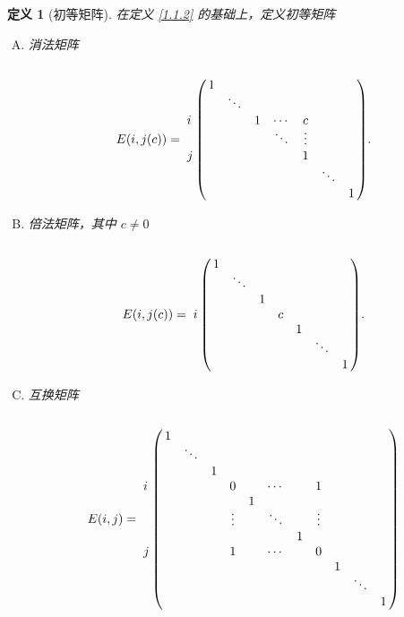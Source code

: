 \documentclass[10pt,openany]{article}
\theoremstyle{thmstyle} %
\theoremstyle{defstyle} %
\newtheorem{definition}[theorem]{定义}
\theoremstyle{prostyle} %
\theoremstyle{exastyle}
\theoremstyle{remstyle}
\begin{document}
\begin{definition}[初等矩阵]
	在定义 \ref{1.1.2} 的基础上，定义初等矩阵
	\begin{enumerate}[(A)]
		\item 消法矩阵
		\[ E(i,j(c))=\bordermatrix{
			& & & & & & & \cr
			& 1 & & & & & &  \cr
			& & \ddots & & & & &  \cr
		\textbf{\(i\)}	& & & 1 & \cdots & c & &  \cr
			& & & & \ddots & \vdots & &  \cr
		\textbf{\(j\)}	& & & & & 1 & &  \cr
			& & & & & & \ddots  &  \cr
			& & & & & & & 1 \cr
		}. \]
		\item 倍法矩阵，其中 \( c \neq 0 \)
		\[ E(i,j(c))=\bordermatrix{
			& & & & & & &  \cr
			& 1 & & & &  & &  \cr
			& & \ddots & & &  & &  \cr
			& & & 1 & &  & &  \cr
			\textbf{\(i\)}	& & & & c & & &   \cr
			& &  & & & 1  & &  \cr
			& & & &  & &\ddots &  \cr
			& & & & & & & 1   \cr
		}. \]
		\item 互换矩阵
		\[
		E(i,j) = \bordermatrix{
			&       &       &       &       &       &       &       &       &       &       &       \cr
			& 1     &       &       &       &       &       &       &       &       &       &       \cr
			&       & \ddots&       &       &       &       &       &       &       &       &       \cr
			&       &       & 1     &       &       &       &       &       &       &       &       \cr
			\textbf{\(i\)} &  &       &       & 0     &       & \cdots&       & 1     &       &       &       \cr
			&       &       &       &       & 1     &       &       &       &       &       &       \cr
			&       &       &       & \vdots&       & \ddots&       & \vdots&       &       &       \cr
			&       &       &       &       &       &       & 1     &       &       &       &       \cr
			\textbf{\(j\)} &  &       &       & 1     &       & \cdots&       & 0     &       &       &       \cr
			&       &       &       &       &       &       &       &       & 1     &       &       \cr
			&       &       &       &       &       &       &       &       &       & \ddots&       \cr
			&       &       &       &       &       &       &       &       &       &       & 1     
		}
		\]
		
	\end{enumerate}
	\label{1.3.3}
\end{definition}
\end{document}
